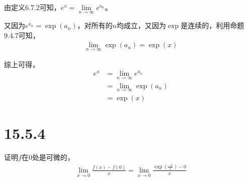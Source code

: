 \documentclass{article}
\begin{document}
\begin{itemize}
        由定义6.7.2可知，$e^x = \lim\limits_{n \to \infty} e^{a_n}$。

        又因为$e^{a_n} = \exp(a_n)$，对所有的$n$均成立，又因为$\exp$是连续的，利用命题9.4.7可知，
        \begin{align*}
          \lim\limits_{n \to \infty} \exp(a_n) = \exp(x)
        \end{align*}

        综上可得，
        \begin{align*}
          e^x & = \lim\limits_{n \to \infty} e^{a_n}   \\
              & = \lim\limits_{n \to \infty} \exp(a_n) \\
              & = \exp(x)
        \end{align*}
\end{itemize}

\section*{15.5.4}

证明$f$在$0$处是可微的，
\begin{align*}
  \lim\limits_{x \to 0} \frac{f(x) - f(0)}{x} = \lim\limits_{x \to 0} \frac{\exp(\frac{-1}{x}) - 0}{x}
\end{align*}
\end{document}
